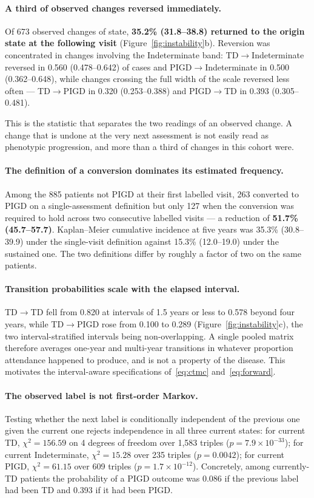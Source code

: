 \documentclass[11pt]{article}
\begin{document}
\paragraph{A third of observed changes reversed immediately.}
Of 673 observed changes of state, \textbf{35.2\% (31.8--38.8) returned to the
origin state at the following visit} (Figure~\ref{fig:instability}b). Reversion
was concentrated in changes involving the Indeterminate band: TD$\to$Indeterminate
reversed in 0.560 (0.478--0.642) of cases and PIGD$\to$Indeterminate in 0.500
(0.362--0.648), while changes crossing the full width of the scale reversed less
often --- TD$\to$PIGD in 0.320 (0.253--0.388) and PIGD$\to$TD in 0.393
(0.305--0.481).

This is the statistic that separates the two readings of an observed change. A
change that is undone at the very next assessment is not easily read as
phenotypic progression, and more than a third of changes in this cohort were.

\paragraph{The definition of a conversion dominates its estimated frequency.}
Among the 885 patients not PIGD at their first labelled visit, 263 converted to
PIGD on a single-assessment definition but only 127 when the conversion was
required to hold across two consecutive labelled visits --- a reduction of
\textbf{51.7\% (45.7--57.7)}. Kaplan--Meier cumulative incidence at five years
was 35.3\% (30.8--39.9) under the single-visit definition against 15.3\%
(12.0--19.0) under the sustained one. The two definitions differ by roughly a
factor of two on the same patients.

\paragraph{Transition probabilities scale with the elapsed interval.}
TD$\to$TD fell from 0.820 at intervals of 1.5 years or less to 0.578 beyond four
years, while TD$\to$PIGD rose from 0.100 to 0.289
(Figure~\ref{fig:instability}c), the two interval-stratified intervals being
non-overlapping. A single pooled matrix therefore averages one-year and
multi-year transitions in whatever proportion attendance happened to produce,
and is not a property of the disease. This motivates the interval-aware
specifications of~\eqref{eq:ctmc} and~\eqref{eq:forward}.

\paragraph{The observed label is not first-order Markov.}
Testing whether the next label is conditionally independent of the previous one
given the current one rejects independence in all three current states: for
current TD, $\chi^2 = 156.59$ on 4 degrees of freedom over 1,583 triples
($p = 7.9 \times 10^{-33}$); for current Indeterminate, $\chi^2 = 15.28$ over
235 triples ($p = 0.0042$); for current PIGD, $\chi^2 = 61.15$ over 609 triples
($p = 1.7 \times 10^{-12}$). Concretely, among currently-TD patients the
probability of a PIGD outcome was 0.086 if the previous label had been TD and
0.393 if it had been PIGD.
\end{document}
